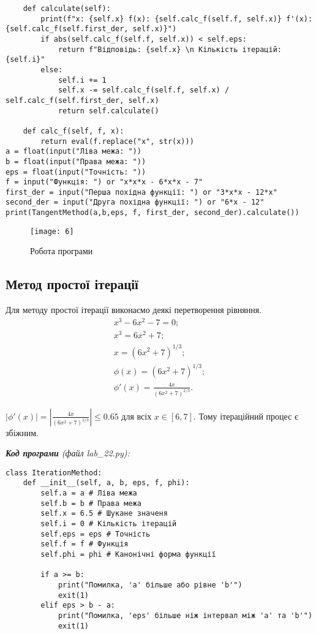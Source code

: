 \documentclass{article}
\begin{document}
\begin{large}
\begin{lstlisting}
	def calculate(self):
		print(f"x: {self.x} f(x): {self.calc_f(self.f, self.x)} f'(x): {self.calc_f(self.first_der, self.x)}")
		if abs(self.calc_f(self.f, self.x)) < self.eps:
			return f"Відповідь: {self.x} \n Кількість ітерацій: {self.i}"
		else:
			self.i += 1
			self.x -= self.calc_f(self.f, self.x) / self.calc_f(self.first_der, self.x)
			return self.calculate()
	
	def calc_f(self, f, x):
		return eval(f.replace("x", str(x)))
a = float(input("Ліва межа: "))
b = float(input("Права межа: "))
eps = float(input("Точність: "))
f = input("Функція: ") or "x*x*x - 6*x*x - 7"
first_der = input("Перша похідна функції: ") or "3*x*x - 12*x"
second_der = input("Друга похідна функції: ") or "6*x - 12"
print(TangentMethod(a,b,eps, f, first_der, second_der).calculate())\end{lstlisting}
	
	\begin{figure}[h!]
		\centering
		\texttt{[image: 6]}
		\caption{Робота програми}
	\end{figure}
	
	\subsection*{Метод простої ітерації}
	Для методу простої ітерації виконаємо деякі перетворення рівняння.
	\begin{gather}
		x^3-6x^2-7=0;\nonumber\\
		x^3=6x^2+7;\nonumber\\
		x=(6x^2+7)^{1/3};\nonumber\\
		\phi(x)=(6x^2+7)^{1/3};\nonumber\\
		\phi'(x) = \frac{4x}{(6x^2+7)^{2/3}}.\nonumber
	\end{gather}
	
	$|\phi'(x)| = |\frac{4x}{(6x^2+7)^{2/3}}| \le 0.65$ для всіх $x\in[6,7]$. Тому ітераційний процес є збіжним.
	
	\noindent\textit{\textbf{Код програми} (файл lab\_22.py):}
	\begin{lstlisting}
class IterationMethod:
	def __init__(self, a, b, eps, f, phi):
		self.a = a # Ліва межа
		self.b = b # Права межа
		self.x = 6.5 # Шукане значеня
		self.i = 0 # Кількість ітерацій
		self.eps = eps # Точність
		self.f = f # Функція
		self.phi = phi # Канонічні форма функції
		
		if a >= b:
			print("Помилка, 'a' більше або рівне 'b'")
			exit(1)
		elif eps > b - a:
			print("Помилка, 'eps' більше ніж інтервал між 'a' та 'b'")
			exit(1)
	

\end{lstlisting}
\end{large}
\end{document}
